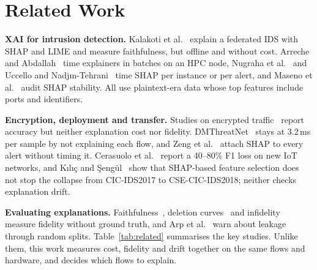 \documentclass[pdflatex,iicol,sn-mathphys-num]{sn-jnl}
\begin{document}
\section{Related Work}\label{sec:related}

\textbf{XAI for intrusion detection.} Kalakoti et al.~\cite{kalakoti2026} explain a federated IDS with SHAP and LIME and measure faithfulness, but offline and without cost. Arreche and Abdallah~\cite{p2} time explainers in batches on an HPC node, Nugraha et al.~\cite{p5} and Uccello and Nadjm-Tehrani~\cite{p6} time SHAP per instance or per alert, and Maseno et al.~\cite{p10} audit SHAP stability. All use plaintext-era data whose top features include ports and identifiers.

\textbf{Encryption, deployment and transfer.} Studies on encrypted traffic~\cite{p1,p3,p4,p7} report accuracy but neither explanation cost nor fidelity. DMThreatNet~\cite{dmthreatnet2026} stays at 3.2\,ms per sample by not explaining each flow, and Zeng et al.~\cite{p8} attach SHAP to every alert without timing it. Cerasuolo et al.~\cite{cerasuolo2026} report a 40--80\% F1 loss on new IoT networks, and K{\i}l{\i}\c{c} and \c{S}eng\"{u}l~\cite{p9} show that SHAP-based feature selection does not stop the collapse from CIC-IDS2017 to CSE-CIC-IDS2018; neither checks explanation drift.

\textbf{Evaluating explanations.} Faithfulness~\cite{bhatt2020}, deletion curves~\cite{samek2017} and infidelity~\cite{yeh2019} measure fidelity without ground truth, and Arp et al.~\cite{arp2022} warn about leakage through random splits. Table~\ref{tab:related} summarises the key studies. Unlike them, this work measures cost, fidelity and drift together on the same flows and hardware, and decides which flows to explain.
\end{document}
